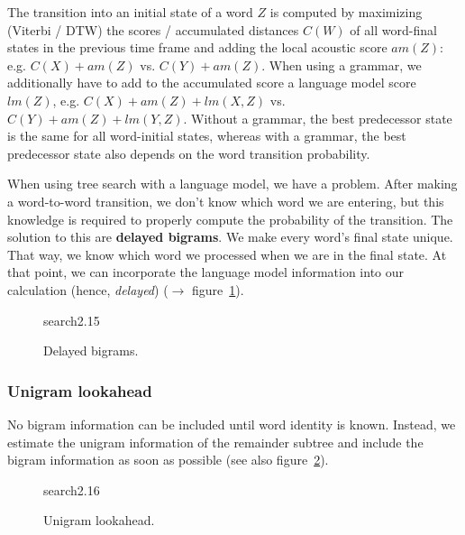 The transition into an initial state of a word $Z$ is computed by maximizing (Viterbi / DTW) the scores / accumulated distances $C(W)$ of all word-final states in the previous time frame and adding the local acoustic score $am(Z)$: e.g. $C(X) + am(Z)$ vs. $C(Y) + am(Z)$. When using a grammar, we additionally have to add to the accumulated score a language model score $lm(Z)$, e.g. $C(X) + am(Z) + lm(X, Z)$ vs. $C(Y) + am(Z) + lm(Y,Z)$. Without a grammar, the best predecessor state is the same for all word-initial states, whereas with a grammar, the best predecessor state also depends on the word transition probability.

\vspace{10pt}

When using tree search with a language model, we have a problem. After making a word-to-word transition, we don't know which word we are entering, but this knowledge is required to properly compute the probability of the transition. The solution to this are \textbf{delayed bigrams}. We make every word's final state unique. That way, we know which word we processed when we are in the final state. At that point, we can incorporate the language model information into our calculation (hence,
\textit{delayed}) ($\to$ figure~\ref{fig:delayedBigrams}).
\begin{figure}[htb]
    \begin{minipage}{\linewidth}
        \vspace{4cm}
        \hfill \scriptsize search2.15
    \end{minipage}
    \caption{\label{fig:delayedBigrams} Delayed bigrams.}
\end{figure}

\vspace{10pt}

\subsubsection{Unigram lookahead}
No bigram information can be included until word identity is known. Instead, we estimate the unigram information of the remainder subtree and include the bigram information as soon as possible (see also figure~\ref{fig:unigramLookahead}).
\begin{figure}[htb]
    \begin{minipage}{\linewidth}
        \vspace{4cm}
        \hfill \scriptsize search2.16
    \end{minipage}
    \caption{\label{fig:unigramLookahead} Unigram lookahead.}
\end{figure}

